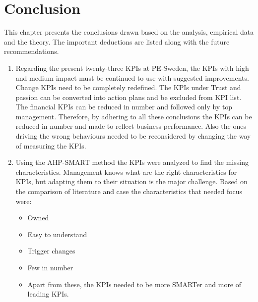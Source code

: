 \chapter{Conclusion}
This chapter presents the conclusions drawn based on the analysis, empirical data and the theory. The important deductions are listed along with the future recommendations.
\begin{enumerate}
    \item Regarding the present twenty-three KPIs at PE-Sweden, the KPIs with high and medium impact must be continued to use with suggested improvements. Change KPIs need to be completely redefined. The KPIs under Trust and passion can be converted into action plans and be excluded from KPI list. The financial KPIs can be reduced in number and followed only by top management. Therefore, by adhering to all these conclusions the KPIs can be reduced in number and made to reflect business performance. Also the ones driving the wrong behaviours needed to be reconsidered by changing the way of measuring the KPIs.
    \item Using the AHP-SMART method the KPIs were analyzed to find the missing characteristics. Management knows what are the right characteristics for KPIs, but adapting them to their situation is the major challenge. Based on the comparison of literature and case the characteristics that needed focus were:
    \begin{itemize}
        \item Owned
        \item Easy to understand 
        \item Trigger changes
        \item Few in number
        \item Apart from these, the KPIs needed to be more SMARTer and more of leading KPIs.
    \end{itemize}
    

\end{enumerate}
